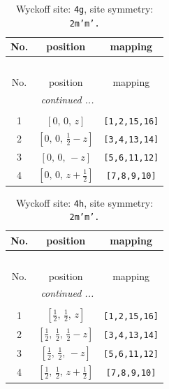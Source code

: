 \documentclass[fleqn,8pt]{jsarticle}
\begin{document}
\begin{longtable}{ccc}
\caption{Wyckoff site: {\tt 4g}, site symmetry: {\tt 2m'm'.}}
 \\
 \hline \hline
No. & position & mapping \\ \hline \endfirsthead

\multicolumn{2}{l}{\tablename\ \thetable{}} \\
 \hline \hline
No. & position & mapping \\ \hline \endhead

 \hline \hline
\multicolumn{2}{r}{\footnotesize\it continued ...} \\ \endfoot

 \hline \hline
\multicolumn{2}{r}{} \\ \endlastfoot

1 & $\left[ 0,\, 0,\, z \right]$ & {\tt [1,2,15,16]} \\ \hline
2 & $\left[ 0,\, 0,\, \frac{1}{2} - z \right]$ & {\tt [3,4,13,14]} \\ \hline
3 & $\left[ 0,\, 0,\, - z \right]$ & {\tt [5,6,11,12]} \\ \hline
4 & $\left[ 0,\, 0,\, z + \frac{1}{2} \right]$ & {\tt [7,8,9,10]} \\
\end{longtable}
\renewcommand{\arraystretch}{1.2}
\begin{longtable}{ccc}
\caption{Wyckoff site: {\tt 4h}, site symmetry: {\tt 2m'm'.}}
 \\
 \hline \hline
No. & position & mapping \\ \hline \endfirsthead

\multicolumn{2}{l}{\tablename\ \thetable{}} \\
 \hline \hline
No. & position & mapping \\ \hline \endhead

 \hline \hline
\multicolumn{2}{r}{\footnotesize\it continued ...} \\ \endfoot

 \hline \hline
\multicolumn{2}{r}{} \\ \endlastfoot

1 & $\left[ \frac{1}{2},\, \frac{1}{2},\, z \right]$ & {\tt [1,2,15,16]} \\ \hline
2 & $\left[ \frac{1}{2},\, \frac{1}{2},\, \frac{1}{2} - z \right]$ & {\tt [3,4,13,14]} \\ \hline
3 & $\left[ \frac{1}{2},\, \frac{1}{2},\, - z \right]$ & {\tt [5,6,11,12]} \\ \hline
4 & $\left[ \frac{1}{2},\, \frac{1}{2},\, z + \frac{1}{2} \right]$ & {\tt [7,8,9,10]} \\
\end{longtable}
\end{document}
